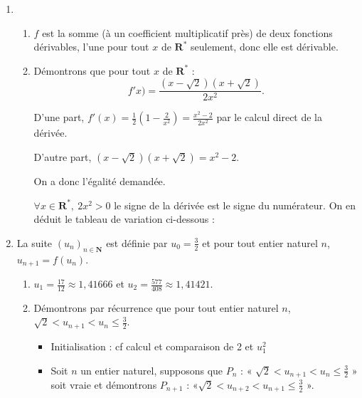 \documentclass[a4paper,12pt,french]{article}
\newcommand{\N}{\mathbf{N}}
\newcommand{\R}{\mathbf{R}}
\begin{document}
\begin{Answer}[number=104]
  \begin{enumerate}
    \item \begin{enumerate}
        \item $f$ est la somme (à un coefficient multiplicatif près) de
          deux fonctions dérivables, l'une pour tout $x$ de $\R^*$
          seulement, donc elle est dérivable.
        \item Démontrons que pour tout $x$ de $\R^*$ : \[ f'x) = \frac{
          (x - \sqrt{2})(x + \sqrt{2})}{2x^2}.\] 

          D'une part, $f'(x) = \frac12\left( 1 - \frac2{x^2}\right) =
          \frac{x^2 -2}{2x^2}$ par le calcul direct de la dérivée.

          D'autre part, $(x-\sqrt{2})(x+\sqrt{2}) = x^2 - 2$.

          On a donc l'égalité demandée.

          $\forall x\in\R^*,\ 2x^2 > 0$ le signe de la dérivée est le
          signe du numérateur. On en déduit le tableau de variation
          ci-dessous :

          \begin{center}
          \end{center}

      \end{enumerate}
    \item La suite $(u_n)_{n\in\N}$ est définie par $u_0 = \frac32$ et
      pour tout entier naturel $n$, $u_{n+1} = f(u_n)$.
      \begin{enumerate}
        \item $u_1 = \frac{17}{12} \approx 1,41666$ et $u_2 =
          \frac{577}{408} \approx 1,41421$.
        \item Démontrons par récurrence que pour tout entier naturel $n$,
          $\sqrt{2} < u_{n+1} < u_n \leqslant \frac32$.
          \begin{itemize}
            \item Initialisation : cf calcul et comparaison de 2 et
              $u_1^2$
            \item Soit $n$ un entier naturel, supposons que $P_n$ : «
              $\sqrt{2} < u_{n+1} < u_n \leqslant \frac32$ » soit vraie
              et démontrons $P_{n+1}$ : «$\sqrt{2} < u_{n+2} < u_{n+1}
              \leqslant \frac32$ ».


\end{itemize}
\end{enumerate}
\end{enumerate}
\end{Answer}
\end{document}
